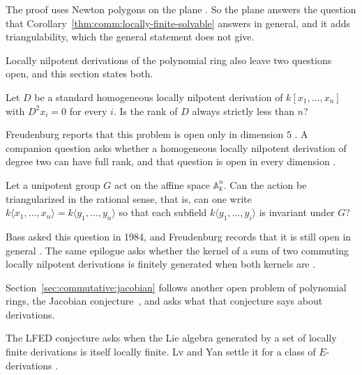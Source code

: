 The proof uses Newton polygons on the plane
\cite[pp.~10--16]{Zaidenberg2026LocallyFinite}. So the plane answers the
question that Corollary~\ref{thm:comm:locally-finite-solvable} answers in
general, and it adds triangulability, which the general statement does not
give.

Locally nilpotent derivations of the polynomial ring also leave two questions
open, and this section states both. %

\begin{problem}\label{prob:open:hdp}
Let $D$ be a standard homogeneous locally nilpotent derivation of
$k[x_1,\dots,x_n]$ with $D^2x_i=0$ for every $i$.
Is the rank of $D$ always strictly less than $n$?
\end{problem}

Freudenburg reports that this problem is open only in dimension $5$
\cite[p.~108]{Freudenburg2017}. A companion question asks whether a
homogeneous locally nilpotent derivation of degree two can have full rank, and
that question is open in every dimension \cite[Remark~3.51, p.~112]{Freudenburg2017}.

\begin{problem}\label{prob:open:bass}
Let a unipotent group $G$ act on the affine space $\mathbb{A}^n_k$.
Can the action be triangularized in the rational sense, that is, can one write
$k\langle x_1,\dots,x_n\rangle=k\langle y_1,\dots,y_n\rangle$ so that each
subfield $k\langle y_1,\dots,y_i\rangle$ is invariant under $G$?
\end{problem}

Bass asked this question in 1984, and Freudenburg records that it is still
open in general \cite[p.~288]{Freudenburg2017}. The same epilogue asks whether
the kernel of a sum of two commuting locally nilpotent derivations is finitely
generated when both kernels are \cite[Question~11.11, p.~291]{Freudenburg2017}.

Section~\ref{sec:commutative:jacobian} follows another open problem of
polynomial rings, the Jacobian
conjecture~\cite[p.~91]{VanEssenKurodaKoenig2021}, and asks what that
conjecture says about derivations.

The LFED conjecture asks when the Lie algebra generated by a set of locally
finite derivations is itself locally finite. Lv and Yan settle it for a class
of $E$-derivations \cite[Abstract, p.~1]{LvYan2020LFED}.

